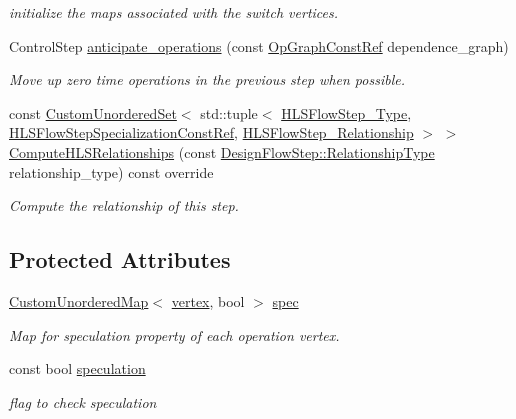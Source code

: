 \begin{DoxyCompactItemize}
\begin{DoxyCompactList}\small\item\em initialize the maps associated with the switch vertices. \end{DoxyCompactList}\item 
Control\+Step \hyperlink{classScheduling_acbaf1ca26611af23e5ebcfc21b2ea105}{anticipate\+\_\+operations} (const \hyperlink{op__graph_8hpp_a9a0b240622c47584bee6951a6f5de746}{Op\+Graph\+Const\+Ref} dependence\+\_\+graph)
\begin{DoxyCompactList}\small\item\em Move up zero time operations in the previous step when possible. \end{DoxyCompactList}\item 
const \hyperlink{classCustomUnorderedSet}{Custom\+Unordered\+Set}$<$ std\+::tuple$<$ \hyperlink{hls__step_8hpp_ada16bc22905016180e26fc7e39537f8d}{H\+L\+S\+Flow\+Step\+\_\+\+Type}, \hyperlink{hls__step_8hpp_a5fdd2edf290c196531d21d68e13f0e74}{H\+L\+S\+Flow\+Step\+Specialization\+Const\+Ref}, \hyperlink{hls__step_8hpp_a3ad360b9b11e6bf0683d5562a0ceb169}{H\+L\+S\+Flow\+Step\+\_\+\+Relationship} $>$ $>$ \hyperlink{classScheduling_a60e98bfbe377334ea3f3c0de2f2ab758}{Compute\+H\+L\+S\+Relationships} (const \hyperlink{classDesignFlowStep_a723a3baf19ff2ceb77bc13e099d0b1b7}{Design\+Flow\+Step\+::\+Relationship\+Type} relationship\+\_\+type) const override
\begin{DoxyCompactList}\small\item\em Compute the relationship of this step. \end{DoxyCompactList}\end{DoxyCompactItemize}
\subsection*{Protected Attributes}
\begin{DoxyCompactItemize}
\item 
\hyperlink{custom__map_8hpp_ad1ed68f2ff093683ab1a33522b144adc}{Custom\+Unordered\+Map}$<$ \hyperlink{graph_8hpp_abefdcf0544e601805af44eca032cca14}{vertex}, bool $>$ \hyperlink{classScheduling_a339591a82e4f4ca0340dd19ace0f632d}{spec}
\begin{DoxyCompactList}\small\item\em Map for speculation property of each operation vertex. \end{DoxyCompactList}\item 
const bool \hyperlink{classScheduling_a930765bc71ebc46f138194dcdf3bd4cb}{speculation}
\begin{DoxyCompactList}\small\item\em flag to check speculation \end{DoxyCompactList}\end{DoxyCompactItemize}
